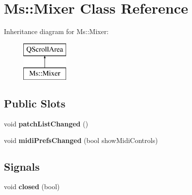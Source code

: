 \hypertarget{class_ms_1_1_mixer}{}\section{Ms\+:\+:Mixer Class Reference}
\label{class_ms_1_1_mixer}
Inheritance diagram for Ms\+:\+:Mixer\+:\begin{figure}[H]
\begin{center}
\leavevmode
\includegraphics[height=2.000000cm]{class_ms_1_1_mixer}
\end{center}
\end{figure}
\subsection*{Public Slots}
\begin{DoxyCompactItemize}
\item 
\mbox{\label{class_ms_1_1_mixer_abc763ccef98923687541b12f47750276}} 
void {\bfseries patch\+List\+Changed} ()
\item 
\mbox{\label{class_ms_1_1_mixer_aaa1a518785bab027ba1ada82382c2eb2}} 
void {\bfseries midi\+Prefs\+Changed} (bool show\+Midi\+Controls)
\end{DoxyCompactItemize}
\subsection*{Signals}
\begin{DoxyCompactItemize}
\item 
\mbox{\label{class_ms_1_1_mixer_a12f687c9bf50bbb01a20354f12991d24}} 
void {\bfseries closed} (bool)
\end{DoxyCompactItemize}

